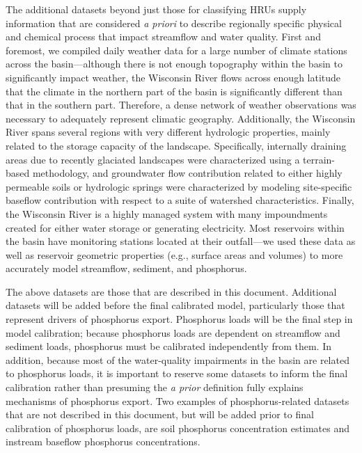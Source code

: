 The additional datasets beyond just those for classifying HRUs supply information that are considered \textit{a priori} to describe regionally specific physical and chemical process that impact streamflow and water quality. First and foremost, we compiled daily weather data for a large number of climate stations across the basin---although there is not enough topography within the basin to significantly impact weather, the Wisconsin River flows across enough latitude that the climate in the northern part of the basin is significantly different than that in the southern part. Therefore, a dense network of weather observations was necessary to adequately represent climatic geography. Additionally, the Wisconsin River spans several regions with very different hydrologic properties, mainly related to the storage capacity of the landscape. Specifically, internally draining areas due to recently glaciated landscapes were characterized using a terrain-based methodology, and groundwater flow contribution related to either highly permeable soils or hydrologic springs were characterized by modeling site-specific baseflow contribution with respect to a suite of watershed characteristics. Finally, the Wisconsin River is a highly managed system with many impoundments created for either water storage or generating electricity. Most reservoirs within the basin have monitoring stations located at their outfall---we used these data as well as reservoir geometric properties (e.g., surface areas and volumes) to more accurately model streamflow, sediment, and phosphorus.

The above datasets are those that are described in this document. Additional datasets will be added before the final calibrated model, particularly those that represent drivers of phosphorus export. Phosphorus loads will be the final step in model calibration; because phosphorus loads are dependent on streamflow and sediment loads, phosphorus must be calibrated independently from them. In addition, because most of the water-quality impairments in the basin are related to phosphorus loads, it is important to reserve some datasets to inform the final calibration rather than presuming the \textit{a prior} definition fully explains mechanisms of phosphorus export. Two examples of phosphorus-related datasets that are not described in this document, but will be added prior to final calibration of phosphorus loads, are soil phosphorus concentration estimates and instream baseflow phosphorus concentrations.

